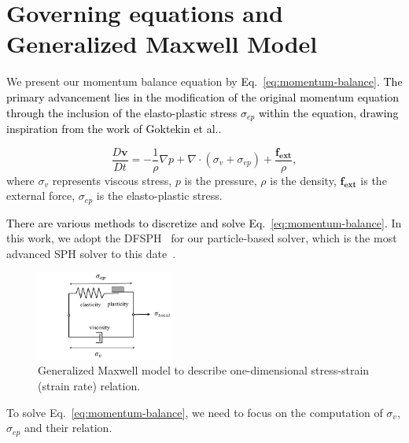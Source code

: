 \documentclass[10pt,journal,compsoc]{IEEEtran}
\newcommand{\revised}[1]{{\textcolor{black}{#1}}}
\begin{document}


\section{Governing equations and Generalized Maxwell Model}\label{sec:govern-eq-and-maxwell}

We present our momentum balance equation by \revised{Eq.~\ref{eq:momentum-balance}}. \revised{The primary advancement lies in the modification of the original momentum equation through the inclusion of the elasto-plastic stress $\sigma_{ep}$ within the equation, drawing inspiration from the work of Goktekin et al.\cite{Goktekin2004}.}


\begin{equation}
	\frac{D \mathbf{v}}{D t}=-\frac{1}{\rho} \nabla p+ \nabla \cdot (\sigma_v+\sigma_{ep}) +\frac{\mathbf{f_{ext}}}{\rho}, \label{eq:momentum-balance}
\end{equation}
where  $\sigma_v$ represents viscous stress, $p$ is the pressure, $\rho$ is the density, $\mathbf{f_{ext}}$ is the external force, $\sigma_{ep}$ is the elasto-plastic stress.

\revised{There are various methods to discretize and solve Eq.~\ref{eq:momentum-balance}.} In this work, we adopt the DFSPH~\cite{Bender2017-DFSPH}  for our particle-based solver, which is the most advanced SPH solver to this date~\cite{Koschier2019-Tut}.



\begin{figure}[htbp]
	\centering
	\includegraphics[width=0.4\textwidth]{pics/maxwell.png}
	\caption{Generalized Maxwell model to describe one-dimensional stress-strain (strain rate) relation.}     \label{fig:maxwell}
\end{figure}

To solve Eq.~\ref{eq:momentum-balance}, we need to focus on the computation of $\sigma_v$, $\sigma_{ep}$ and their relation.
\end{document}
